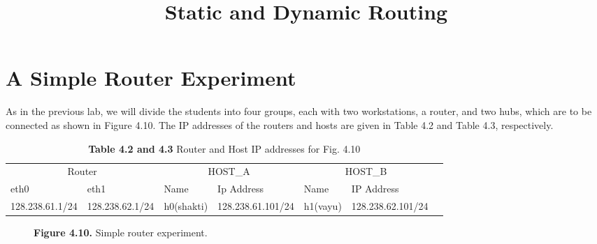 \documentclass{../UTNetLab}
\title{Static and Dynamic Routing}
\author{%
    Dr. Ahmad Khonsari - \FR{دکتر احمد خونساری}\\
    \href{mailto:a_khonsari@ut.ac.ir}{a\_khonsari@ut.ac.ir}\\
    \vskip 1.5em%
    Amir Haji Ali Khamseh'i - \FR{امیر حاجی‌علی‌خمسه‌ء}\\
    \href{mailto:khamse@ut.ac.ir}{khamse@ut.ac.ir}\\
    \vskip 1.5em%
    \href{mailto:m.borhani@ut.ac.ir}{Muhammad Borhani} - \FR{محمد برهانی}\\
    \href{mailto:a.a.khordadi@ut.ac.ir}{Amirahmad Khordadi} - \FR{امیراحمد خردادی}\\
    \href{mailto:sina\_kashipazha@ut.ac.ir}{Sina Kashi pazha} - \FR{سینا کاشی‌پزها}
}
\begin{document}
    \maketitle

\section*{A Simple Router Experiment}
    As in the previous lab, we will divide the students into four groups, each with two workstations, a router, and two hubs, which are to be connected as shown in Figure 4.10.
    The IP addresses of the routers and hosts are given in Table 4.2 and Table 4.3, respectively.
    \begin{table}[H]
        \caption{\textbf{Table 4.2 and 4.3} Router and Host IP addresses for Fig. 4.10}
        \vspace{5pt}
        \centering
        \large
        \begin{tabular}{ *7l }
            \hline \hline
            \multicolumn{2}{c}{Router} & \multicolumn{2}{c}{HOST\_A} & \multicolumn{2}{c}{HOST\_B} \\
            eth0 & eth1 & Name & Ip Address & Name & IP Address \\
            \hline 
            128.238.61.1/24 & 128.238.62.1/24 & h0(shakti) & 128.238.61.101/24 & h1(vayu) & 128.238.62.101/24 \\
            \hline \hline
            \end{tabular}
    \end{table}

    \begin{figure}[H]
        \centering
        \caption{\textbf{Figure 4.10.} Simple router experiment.}        
    \end{figure}
\end{document}
